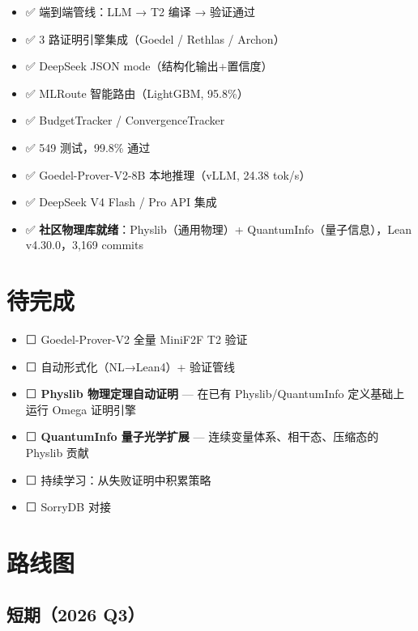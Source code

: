 \documentclass[
  11pt,
  a4paper,
]{ctexrep}
\providecommand{\tightlist}{%
  \setlength{\itemsep}{0pt}\setlength{\parskip}{0pt}}
\begin{document}
\begin{itemize}
\tightlist
\item
  ✅ 端到端管线：LLM → T2 编译 → 验证通过
\item
  ✅ 3 路证明引擎集成（Goedel / Rethlas / Archon）
\item
  ✅ DeepSeek JSON mode（结构化输出+置信度）
\item
  ✅ MLRoute 智能路由（LightGBM, 95.8\%）
\item
  ✅ BudgetTracker / ConvergenceTracker
\item
  ✅ 549 测试，99.8\% 通过
\item
  ✅ Goedel-Prover-V2-8B 本地推理（vLLM, 24.38 tok/s）
\item
  ✅ DeepSeek V4 Flash / Pro API 集成
\item
  ✅ \textbf{社区物理库就绪}：Physlib（通用物理）+
  QuantumInfo（量子信息），Lean v4.30.0，3,169 commits
\end{itemize}

\section{待完成}\label{sec-todo}

\begin{itemize}
\tightlist
\item
  ⬜ Goedel-Prover-V2 全量 MiniF2F T2 验证
\item
  ⬜ 自动形式化（NL→Lean4）+ 验证管线
\item
  ⬜ \textbf{Physlib 物理定理自动证明} --- 在已有 Physlib/QuantumInfo
  定义基础上运行 Omega 证明引擎
\item
  ⬜ \textbf{QuantumInfo 量子光学扩展} ---
  连续变量体系、相干态、压缩态的 Physlib 贡献
\item
  ⬜ 持续学习：从失败证明中积累策略
\item
  ⬜ SorryDB 对接
\end{itemize}

\section{路线图}\label{sec-roadmap}

\subsection{短期（2026 Q3）}\label{ux77edux671f2026-q3}
\end{document}

